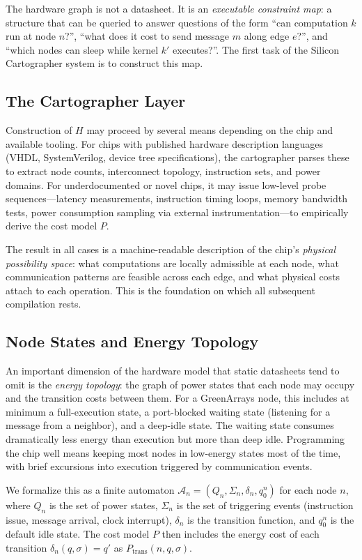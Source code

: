 \documentclass[11pt, a4paper]{article}
\begin{document}
The hardware graph is not a datasheet. It is an \emph{executable constraint map}: a
structure that can be queried to answer questions of the form ``can computation $k$ run
at node $n$?'', ``what does it cost to send message $m$ along edge $e$?'', and
``which nodes can sleep while kernel $k'$ executes?''. The first task of the Silicon
Cartographer system is to construct this map.

\subsection{The Cartographer Layer}

Construction of $H$ may proceed by several means depending on the chip and available
tooling. For chips with published hardware description languages (VHDL, SystemVerilog,
device tree specifications), the cartographer parses these to extract node counts,
interconnect topology, instruction sets, and power domains. For underdocumented or novel
chips, it may issue low-level probe sequences---latency measurements, instruction timing
loops, memory bandwidth tests, power consumption sampling via external instrumentation---to
empirically derive the cost model $P$.

The result in all cases is a machine-readable description of the chip's \emph{physical
possibility space}: what computations are locally admissible at each node, what
communication patterns are feasible across each edge, and what physical costs attach
to each operation. This is the foundation on which all subsequent compilation rests.

\subsection{Node States and Energy Topology}

An important dimension of the hardware model that static datasheets tend to omit is
the \emph{energy topology}: the graph of power states that each node may occupy and
the transition costs between them. For a GreenArrays node, this includes at minimum a
full-execution state, a port-blocked waiting state (listening for a message from a neighbor),
and a deep-idle state. The waiting state consumes dramatically less energy than execution
but more than deep idle. Programming the chip well means keeping most nodes in low-energy
states most of the time, with brief excursions into execution triggered by communication
events.

We formalize this as a finite automaton $\mathcal{A}_n = (Q_n, \Sigma_n, \delta_n, q_0^n)$
for each node $n$, where $Q_n$ is the set of power states, $\Sigma_n$ is the set of
triggering events (instruction issue, message arrival, clock interrupt), $\delta_n$ is
the transition function, and $q_0^n$ is the default idle state. The cost model $P$ then
includes the energy cost of each transition $\delta_n(q, \sigma) = q'$ as
$P_{\text{trans}}(n, q, \sigma)$.
\end{document}
